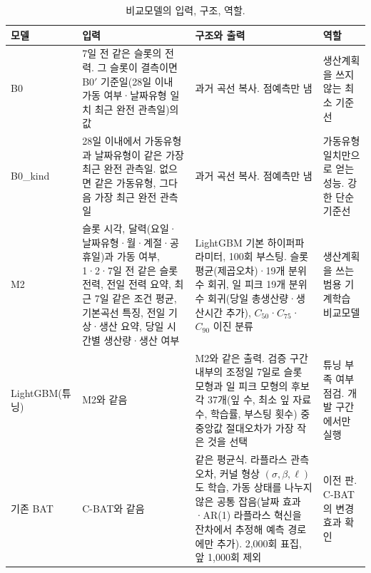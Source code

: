 \begin{table}[htbp]
\centering
\hwptablefont
\setlength{\tabcolsep}{3pt}
\caption{비교모델의 입력, 구조, 역할.}\label{tab:ch2-models}
\begin{tabular}{L{2.3cm}L{4.4cm}L{5.3cm}L{3.4cm}}
\toprule
모델 & 입력 & 구조와 출력 & 역할 \\
\midrule
B0 & 7일 전 같은 슬롯의 전력. 그 슬롯이 결측이면 B0$'$ 기준일(28일 이내 가동 여부·날짜유형 일치 최근 완전 관측일)의 값 & 과거 곡선 복사. 점예측만 냄 & 생산계획을 쓰지 않는 최소 기준선 \\
B0\_kind & 28일 이내에서 가동유형과 날짜유형이 같은 가장 최근 완전 관측일. 없으면 같은 가동유형, 그다음 가장 최근 완전 관측일 & 과거 곡선 복사. 점예측만 냄 & 가동유형 일치만으로 얻는 성능. 강한 단순 기준선 \\
M2 & 슬롯 시각, 달력(요일·날짜유형·월·계절·공휴일)과 가동 여부, 1·2·7일 전 같은 슬롯 전력, 전일 전력 요약, 최근 7일 같은 조건 평균, 기본곡선 특징, 전일 기상·생산 요약, 당일 시간별 생산량·생산 여부 & LightGBM 기본 하이퍼파라미터, 100회 부스팅. 슬롯 평균(제곱오차)·19개 분위수 회귀, 일 피크 19개 분위수 회귀(당일 총생산량·생산시간 추가), $C_{50}$·$C_{75}$·$C_{90}$ 이진 분류 & 생산계획을 쓰는 범용 기계학습 비교모델 \\
LightGBM(튜닝) & M2와 같음 & M2와 같은 출력. 검증 구간 내부의 조정일 7일로 슬롯 모형과 일 피크 모형의 후보 각 37개(잎 수, 최소 잎 자료 수, 학습률, 부스팅 횟수) 중 중앙값 절대오차가 가장 작은 것을 선택 & 튜닝 부족 여부 점검. 개발 구간에서만 실행 \\
기존 BAT & C-BAT와 같음 & 같은 평균식. 라플라스 관측오차, 커널 형상 $(\sigma,\beta,\ell)$도 학습, 가동 상태를 나누지 않은 공통 잡음(날짜 효과·AR(1) 라플라스 혁신을 잔차에서 추정해 예측 경로에만 추가). 2,000회 표집, 앞 1,000회 제외 & 이전 판. C-BAT의 변경 효과 확인 \\
\bottomrule
\end{tabular}
\end{table}

